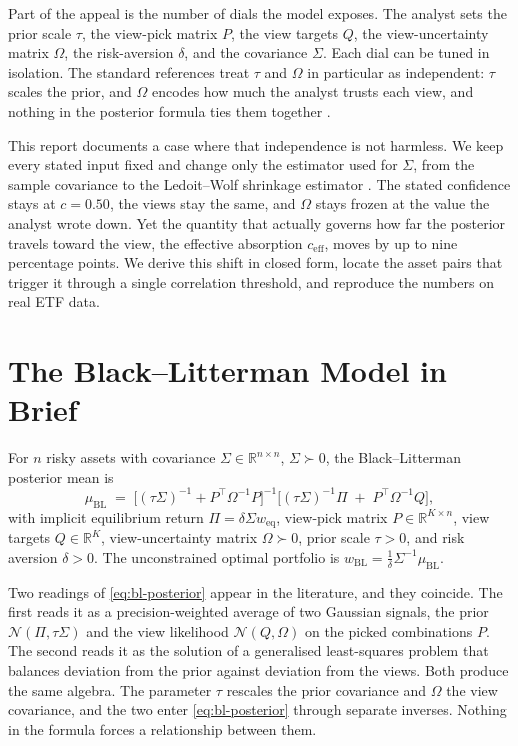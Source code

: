 \documentclass[a4paper,11pt]{article}
\theoremstyle{plain}
\theoremstyle{definition}
\newcommand{\R}{\mathbb{R}}
\newcommand{\Sig}{\Sigma}
\newcommand{\Om}{\Omega}
\newcommand{\muBL}{\mu_{\mathrm{BL}}}
\newcommand{\eff}{\mathrm{eff}}
\begin{document}
Part of the appeal is the number of dials the model exposes. The analyst sets
the prior scale $\tau$, the view-pick matrix $P$, the view targets $Q$, the
view-uncertainty matrix $\Omega$, the risk-aversion $\delta$, and the covariance
$\Sigma$. Each dial can be tuned in isolation. The standard references treat
$\tau$ and $\Omega$ in particular as independent: $\tau$ scales the prior, and
$\Omega$ encodes how much the analyst trusts each view, and nothing in the
posterior formula ties them together \citep{Idzorek2004, Meucci2006}.

This report documents a case where that independence is not harmless. We keep
every stated input fixed and change only the estimator used for $\Sigma$, from
the sample covariance to the Ledoit--Wolf shrinkage estimator
\citep{LedoitWolf2004}. The stated confidence stays at $c = 0.50$, the views stay
the same, and $\Omega$ stays frozen at the value the analyst wrote down. Yet the
quantity that actually governs how far the posterior travels toward the view, the
effective absorption $c_{\eff}$, moves by up to nine percentage points. We
derive this shift in closed form, locate the asset pairs that trigger it through
a single correlation threshold, and reproduce the numbers on real ETF data.

\section{The Black--Litterman Model in Brief}
\label{sec:blm}

For $n$ risky assets with covariance $\Sigma \in \R^{n \times n}$, $\Sigma \succ 0$,
the Black--Litterman posterior mean is
\begin{equation}
\label{eq:bl-posterior}
  \muBL \;=\; \bigl[(\tau\Sig)^{-1} + P^\top\Om^{-1}P\bigr]^{-1}
              \bigl[(\tau\Sig)^{-1}\Pi \;+\; P^\top\Om^{-1}Q\bigr],
\end{equation}
with implicit equilibrium return $\Pi = \delta\Sigma w_{\mathrm{eq}}$, view-pick
matrix $P \in \R^{K \times n}$, view targets $Q \in \R^K$, view-uncertainty matrix
$\Om \succ 0$, prior scale $\tau > 0$, and risk aversion $\delta > 0$. The
unconstrained optimal portfolio is $w_{\mathrm{BL}} = \tfrac{1}{\delta}\Sigma^{-1}\muBL$.

Two readings of \eqref{eq:bl-posterior} appear in the literature, and they
coincide. The first reads it as a precision-weighted average of two Gaussian
signals, the prior $\mathcal{N}(\Pi, \tau\Sigma)$ and the view likelihood
$\mathcal{N}(Q, \Omega)$ on the picked combinations $P$. The second reads it as
the solution of a generalised least-squares problem that balances deviation from
the prior against deviation from the views. Both produce the same algebra. The
parameter $\tau$ rescales the prior covariance and $\Omega$ the view covariance,
and the two enter \eqref{eq:bl-posterior} through separate inverses. Nothing in
the formula forces a relationship between them.
\end{document}
